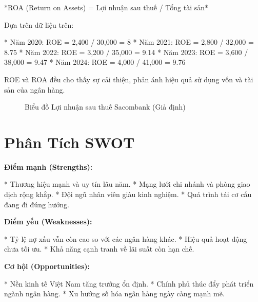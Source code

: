 \documentclass[12pt]{article}
\begin{document}
*ROA (Return on Assets) = Lợi nhuận sau thuế / Tổng tài sản*

Dựa trên dữ liệu trên:

*   Năm 2020: ROE = 2,400 / 30,000 = 8%
*   Năm 2021: ROE = 2,800 / 32,000 = 8.75%
*   Năm 2022: ROE = 3,200 / 35,000 = 9.14%
*   Năm 2023: ROE = 3,600 / 38,000 = 9.47%
*   Năm 2024: ROE = 4,000 / 41,000 = 9.76%

ROE và ROA đều cho thấy sự cải thiện, phản ánh hiệu quả sử dụng vốn và tài sản của ngân hàng.

\begin{figure}[h!]
\centering
{}
\caption{Biểu đồ Lợi nhuận sau thuế Sacombank (Giả định)}
\label{fig:profit_chart}
\end{figure}

\section{Phân Tích SWOT}

\textbf{Điểm mạnh (Strengths):}

*   Thương hiệu mạnh và uy tín lâu năm.
*   Mạng lưới chi nhánh và phòng giao dịch rộng khắp.
*   Đội ngũ nhân viên giàu kinh nghiệm.
*   Quá trình tái cơ cấu đang đi đúng hướng.

\textbf{Điểm yếu (Weaknesses):}

*   Tỷ lệ nợ xấu vẫn còn cao so với các ngân hàng khác.
*   Hiệu quả hoạt động chưa tối ưu.
*   Khả năng cạnh tranh về lãi suất còn hạn chế.

\textbf{Cơ hội (Opportunities):}

*   Nền kinh tế Việt Nam tăng trưởng ổn định.
*   Chính phủ thúc đẩy phát triển ngành ngân hàng.
*   Xu hướng số hóa ngân hàng ngày càng mạnh mẽ.
\end{document}
